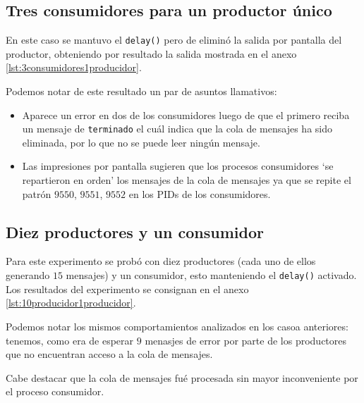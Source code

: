 \subsection{Tres consumidores para un productor único}
En este caso se mantuvo el \texttt{delay()} pero de eliminó la salida por pantalla del productor, obteniendo por resultado la salida mostrada en el anexo \ref{lst:3consumidores1producidor}.

Podemos notar de este resultado un par de asuntos llamativos:
\begin{itemize}
    \item Aparece un error en dos de los consumidores luego de que el primero reciba un mensaje de \texttt{terminado} el cuál indica que la cola de mensajes ha sido eliminada, por lo que no se puede leer ningún mensaje.
    \item Las impresiones por pantalla sugieren que los procesos consumidores `se repartieron en orden' los mensajes de la cola de mensajes ya que se repite el patrón $9550$, $9551$, $9552$ en los PIDs de los consumidores.
\end{itemize}

\subsection{Diez productores y un consumidor}
Para este experimento se probó con diez productores (cada uno de ellos generando $15$ mensajes) y un consumidor, esto manteniendo el \texttt{delay()} activado. Los resultados del experimento se consignan en el anexo \ref{lst:10producidor1producidor}.

Podemos notar los mismos comportamientos analizados en los casoa anteriores: tenemos, como era de esperar $9$ menasjes de error por parte de los productores que no encuentran acceso a la cola de mensajes.

Cabe destacar que la cola de mensajes fué procesada sin mayor inconveniente por el proceso consumidor.
